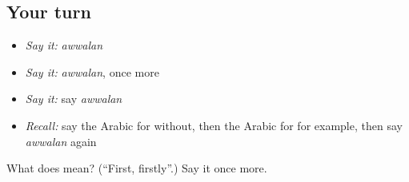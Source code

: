 \subsection*{Your turn}
\begin{itemize}
\raggedright
  \item \emph{Say it:} \emph{awwalan}
  \item \emph{Say it:} \emph{awwalan}, once more
  \item \emph{Say it:} say \emph{awwalan}
  \item \emph{Recall:} say the Arabic for without, then the Arabic for for example, then say \emph{awwalan} again
\end{itemize}

\begin{tcolorbox}[breakable,colback=teal!4,colframe=teal!35!black,title={Before you move on}]
What does  mean? (\textquotedblleft{}First, firstly\textquotedblright{}.) Say it once more.
\end{tcolorbox}
